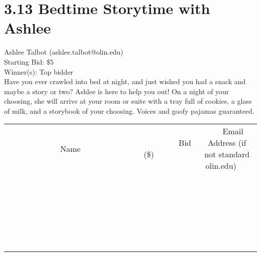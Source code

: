 \documentclass[11pt]{article}
\begin{document}
\section*{3.13 Bedtime Storytime with Ashlee}
Ashlee Talbot (ashlee.talbot@olin.edu) \\
Starting Bid: \$5 \\
Winner(s): 
Top bidder \\
Have you ever crawled into bed at night, and just wished you had a snack and maybe a story or two? Ashlee is here to help you out! On a night of your choosing, she will arrive at your room or suite with a tray full of cookies, a glass of milk, and a storybook of your choosing. Voices and goofy pajamas guaranteed. \\[6ex]
\begin{tabular}{c c c}
~~~~~~~~~~~~~Name~~~~~~~~~~~~~ & ~~~~~~~~~Bid (\$)~~~~~~~~~ & ~~~Email Address (if not standard olin.edu)~~~ \\
 & & \\
\hline
 & & \\
\hline
 & & \\
\hline
 & & \\
\hline
 & & \\
\hline
 & & \\
\hline
 & & \\
\hline
 & & \\
\hline
 & & \\
\hline
 & & \\
\hline
 & & \\
\hline
 & & \\
\hline
 & & \\
\hline
 & & \\
\hline
 & & \\
\hline
 & & \\
\hline
 & & \\
\hline
 & & \\
\hline
 & & \\
\hline
 & & \\
\hline
 & & \\
\hline
 & & \\
\hline
 & & \\
\hline
 & & \\
\hline
 & & \\
\hline
 & & \\
\hline
\end{tabular}
\clearpage
\end{document}

